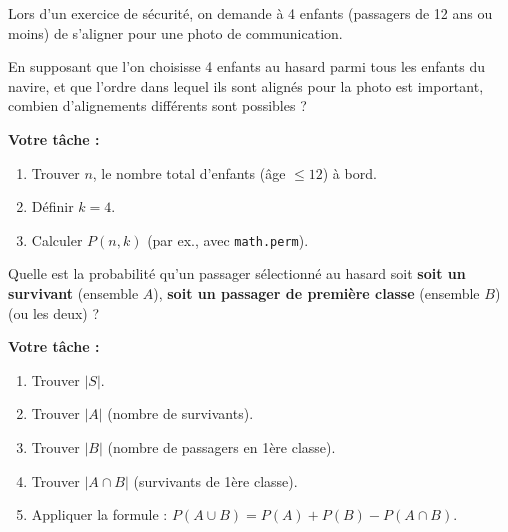 \begin{exercicebox}
Lors d'un exercice de sécurité, on demande à 4 enfants (passagers de 12 ans ou moins) de s'aligner pour une photo de communication.

En supposant que l'on choisisse 4 enfants au hasard parmi tous les enfants du navire, et que l'ordre dans lequel ils sont alignés pour la photo est important, combien d'alignements différents sont possibles ?

\textbf{Votre tâche :}
\begin{enumerate}
    \item Trouver $n$, le nombre total d'enfants (âge $\le 12$) à bord.
    \item Définir $k=4$.
    \item Calculer $P(n, k)$ (par ex., avec \texttt{math.perm}).
\end{enumerate}
\end{exercicebox}

\begin{exercicebox}
Quelle est la probabilité qu'un passager sélectionné au hasard soit \textbf{soit un survivant} (ensemble $A$), \textbf{soit un passager de première classe} (ensemble $B$) (ou les deux) ?

\textbf{Votre tâche :}
\begin{enumerate}
    \item Trouver $|S|$.
    \item Trouver $|A|$ (nombre de survivants).
    \item Trouver $|B|$ (nombre de passagers en 1ère classe).
    \item Trouver $|A \cap B|$ (survivants de 1ère classe).
    \item Appliquer la formule : $P(A \cup B) = P(A) + P(B) - P(A \cap B)$.
\end{enumerate}
\end{exercicebox}

